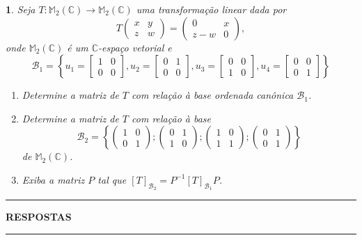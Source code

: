 \documentclass[12pt]{exam}
\newtheorem{exercicio}{}
\newcommand{\complex}{\mathbb{C}}
\newcommand{\cp}[1]{\mathbb{#1}}
\begin{document}
\begin{exercicio}
  Seja $T : \cp{M}_2(\complex) \to \cp{M}_2(\complex)$ uma transforma\c{c}\~ao linear dada por
  \[
    T \begin{pmatrix}
      x & y\\
      z & w
    \end{pmatrix} = \begin{pmatrix}
      0 & x\\
      z - w & 0
    \end{pmatrix},
  \]
  onde $\cp{M}_2(\complex)$ \'e um $\complex$-espa\c{c}o vetorial
  e
  \[
      \mathcal{B}_1 = \left\{u_1 = \begin{bmatrix}
        1 & 0\\0 & 0
      \end{bmatrix}, u_2 = \begin{bmatrix}
        0 & 1\\0 & 0
      \end{bmatrix}, u_3 = \begin{bmatrix}
        0 & 0\\1 & 0
      \end{bmatrix}, u_4 = \begin{bmatrix}
        0 & 0\\0 & 1
      \end{bmatrix}\right\}
  \]
    \begin{enumerate}[label=({\alph*})]
      \item Determine a matriz de $T$ com rela\c{c}\~ao \`a base ordenada can\^onica $\mathcal{B}_1$.
      \item Determine a matriz de $T$ com rela\c{c}\~ao \`a base
      \[
        \mathcal{B}_2 = \left\{\begin{pmatrix}
          1 & 0\\
          0 & 1
        \end{pmatrix}; \begin{pmatrix}
          0 & 1\\
          1 & 0
        \end{pmatrix}; \begin{pmatrix}
          1 & 0\\
          1 & 1
        \end{pmatrix}; \begin{pmatrix}
          0 & 1\\
          0 & 1
        \end{pmatrix}\right\}
      \]
      de $\cp{M}_2(\complex)$.
      \item Exiba a matriz $P$ tal que $[T]_{\mathcal{B}_2} = P^{-1}[T]_{\mathcal{B}_1}P$.
    \end{enumerate}
\end{exercicio}

\newpage
{}
\hrule
\begin{center}
{\large\bf RESPOSTAS}
\end{center}
\hrule

\end{document}
